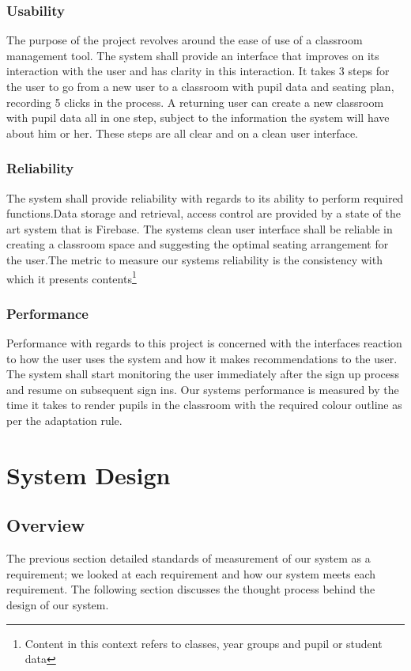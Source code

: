 \subsubsection{Usability}
The purpose of the project revolves around the ease of use of a classroom management tool. The system shall provide an interface that improves on its interaction with the user and has clarity in this interaction. It takes 3 steps for the user to go from a new user to a classroom with pupil data and seating plan, recording 5 clicks in the process. A returning user can create a new classroom with pupil data all in one step, subject to the information the system will have about him or her. These steps are all clear and on a clean user interface. 

\subsubsection{Reliability}
The system shall provide reliability with regards to its ability to perform required functions.Data storage and retrieval, access control are provided by a state of the art system that is Firebase. The systems clean user interface shall be reliable in creating a classroom space and suggesting the optimal seating arrangement for the user.The metric to measure our systems reliability is the consistency with which it presents contents\footnote{Content in this context refers to classes, year groups and pupil or student data} 

\subsubsection{Performance}
Performance with regards to this project is concerned with the interfaces reaction to how the user uses the system and how it makes recommendations to the user. The system shall start monitoring the user immediately after the sign up process and resume on subsequent sign ins. Our systems performance is measured by the time it takes to render pupils in the classroom with the required colour outline as per the adaptation rule.

\section{System Design}

\subsection{Overview}
The previous section detailed standards of measurement of our system as a requirement; we looked at each requirement and how our system meets each requirement. The following section discusses the thought process behind the design of our system.

